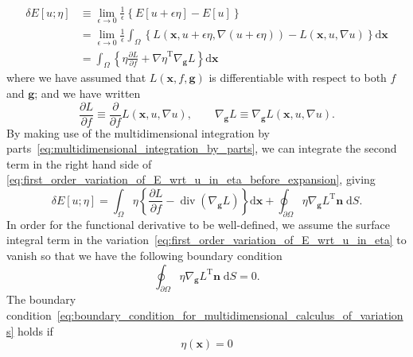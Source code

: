 \documentclass[12pt,a4paper]{article}
\begin{document}
\begin{align}
\delta E[u; \eta] &\equiv
\lim_{\epsilon \to 0} \frac{1}{\epsilon} \left\{ E[u + \epsilon\eta] - E[u] \right\}
\label{eq:first_order_variation_of_E_in_eta} \\
&= \lim_{\epsilon \to 0} \frac{1}{\epsilon}
\int_{\Omega} \left\{
L\left(\mathbf{x}, u + \epsilon\eta, \nabla (u + \epsilon\eta)\right) -
L\left(\mathbf{x}, u, \nabla u\right)
\right\} \mathrm{d}\mathbf{x} \\
&= \int_{\Omega} \left\{
\eta\frac{\partial L}{\partial f} +
{\nabla\eta}^{\operatorname{T}} \nabla_{\mathbf{g}} L
\right\} \mathrm{d}\mathbf{x}
\label{eq:first_order_variation_of_E_wrt_u_in_eta_before_expansion}
\end{align}
where we have assumed that $L(\mathbf{x}, f, \mathbf{g})$ is differentiable with respect to
both $f$ and $\mathbf{g}$; and we have written
\begin{equation}
\frac{\partial L}{\partial f} \equiv
\frac{\partial}{\partial f} L\left(\mathbf{x}, u, \nabla u\right) , \qquad
\nabla_{\mathbf{g}} L \equiv
\nabla_{\mathbf{g}} L\left(\mathbf{x}, u, \nabla u\right) .
\end{equation}
By making use of
the multidimensional integration by parts~\eqref{eq:multidimensional_integration_by_parts},
we can integrate the second term in the right hand side of
\eqref{eq:first_order_variation_of_E_wrt_u_in_eta_before_expansion}, giving
\begin{equation}
\delta E[u; \eta] =
\int_{\Omega} \eta \left\{
\frac{\partial L}{ \partial f} - \operatorname{div}\left( \nabla_{\mathbf{g}} L \right)
\right\} \mathrm{d}\mathbf{x} +
\oint_{\partial\Omega} \eta {\nabla_{\mathbf{g}} L}^{\operatorname{T}} \mathbf{n} \; \mathrm{d}S .
\label{eq:first_order_variation_of_E_wrt_u_in_eta}
\end{equation}
In order for the functional derivative to be well-defined,
we assume the surface integral term in
the variation~\eqref{eq:first_order_variation_of_E_wrt_u_in_eta} to vanish so that
we have the following boundary condition
\begin{equation}
\oint_{\partial\Omega} \eta {\nabla_{\mathbf{g}} L}^{\operatorname{T}} \mathbf{n} \; \mathrm{d}S
= 0.
\label{eq:boundary_condition_for_multidimensional_calculus_of_variations}
\end{equation}
The boundary condition~\eqref{eq:boundary_condition_for_multidimensional_calculus_of_variations}
holds if
\begin{equation}
\eta(\mathbf{x}) = 0
\label{eq:fixed_boundary_condition_for_calculus_of_variations}
\end{equation}
\end{document}
